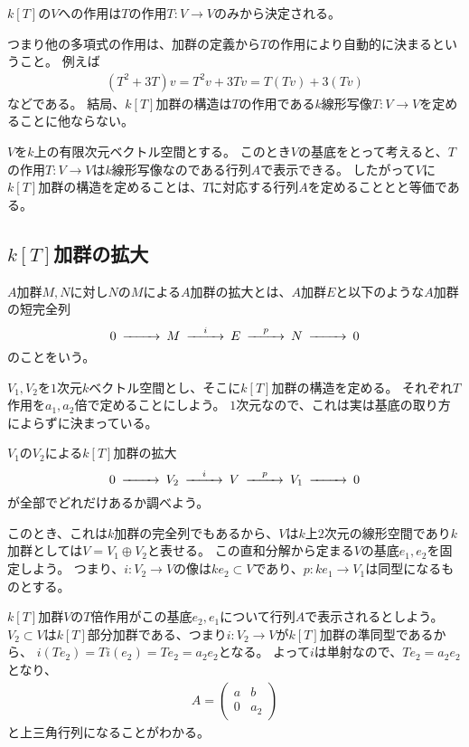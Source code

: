 \documentclass{jsarticle}
\begin{document}
\begin{lem}
$k[T]$の$V$への作用は$T$の作用$T:V \to V$のみから決定される。
\end{lem}
つまり他の多項式の作用は、加群の定義から$T$の作用により自動的に決まるということ。
例えば
\begin{align*}
(T^2+3T)v=T^2v+3Tv=T(Tv)+3(Tv)
\end{align*}
などである。
結局、$k[T]$加群の構造は$T$の作用である$k$線形写像$T:V \to V$を定めることに他ならない。

$V$を$k$上の有限次元ベクトル空間とする。
このとき$V$の基底をとって考えると、$T$の作用$T:V \to V$は$k$線形写像なのである行列$A$で表示できる。
したがって$V$に$k[T]$加群の構造を定めることは、$T$に対応する行列$A$を定めることとと等価である。

\subsection{$k[T]$加群の拡大}
\begin{dfn}
$A$加群$M, N$に対し$N$の$M$による$A$加群の拡大とは、$A$加群$E$と以下のような$A$加群の短完全列
\[
\begin{CD}
0 @>>> M @>i>> E @>p>> N @>>> 0\\
\end{CD}
\]
のことをいう。
\end{dfn}

$V_1, V_2$を$1$次元$k$ベクトル空間とし、そこに$k[T]$加群の構造を定める。
それぞれ$T$作用を$a_1, a_2$倍で定めることにしよう。
$1$次元なので、これは実は基底の取り方によらずに決まっている。

\begin{prob}
$V_1$の$V_2$による$k[T]$加群の拡大
\[
\begin{CD}
0 @>>> V_2 @>i>> V @>p>> V_1 @>>> 0\\
\end{CD}
\]
が全部でどれだけあるか調べよう。
\end{prob}


このとき、これは$k$加群の完全列でもあるから、$V$は$k$上$2$次元の線形空間であり$k$加群としては$V=V_1\oplus V_2$と表せる。
この直和分解から定まる$V$の基底$e_1, e_2$を固定しよう。
つまり、$i:V_2 \to V$の像は$ke_2\subset V$であり、$p:ke_1 \to V_1$は同型になるものとする。

$k[T]$加群$V$の$T$倍作用がこの基底$e_2, e_1$について行列$A$で表示されるとしよう。
$V_2\subset V$は$k[T]$部分加群である、つまり$i:V_2 \to V$が$k[T]$加群の準同型であるから、
$i(Te_2)=Ti(e_2)=Te_2=a_2e_2$となる。
よって$i$は単射なので、$Te_2=a_2e_2$となり、
\begin{align*}
A=\begin{pmatrix}a&b\\0&a_2\end{pmatrix}
\end{align*}
と上三角行列になることがわかる。
\end{document}
